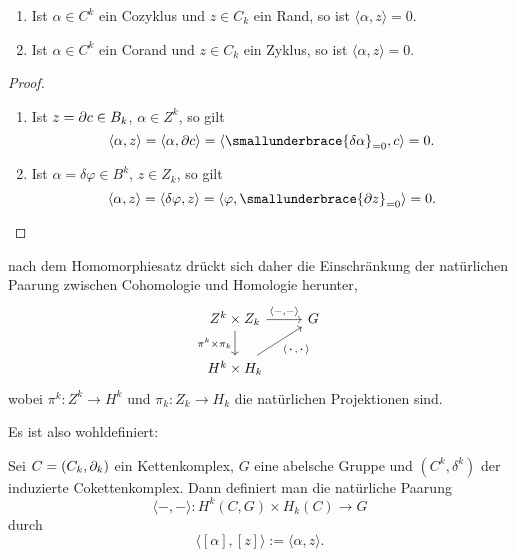 \begin{bemerkung}
  \begin{enumerate}
    \item 
      Ist $\alpha \in C^k$ ein Cozyklus und $z \in C_k$ ein Rand, so ist $\langle \alpha, z \rangle = 0$.
    \item
      Ist $\alpha \in C^k$ ein Corand und $z \in C_k$ ein Zyklus, so ist $\langle \alpha, z \rangle = 0$.
  \end{enumerate}
\end{bemerkung}
\begin{proof}
  \begin{enumerate}
    \item 
      Ist $z = \partial c \in B_k$, $\alpha \in Z^k$, so gilt
      \begin{equation*}
        \langle \alpha,z \rangle = \langle \alpha, \del c \rangle = \langle \smallunderbrace{\delta\alpha}_{=0}, c \rangle = 0.
      \end{equation*}
    \item
      Ist $\alpha = \delta \varphi \in B^k$, $z \in Z_k$, so gilt
      \begin{equation*}
        \langle \alpha,z \rangle = \langle \delta\varphi, z \rangle = \langle \varphi, \smallunderbrace{\del z}_{=0} \rangle = 0.
      \end{equation*}
  \end{enumerate}
\end{proof}
\begin{kommentar}
  nach dem Homomorphiesatz drückt sich daher die Einschränkung der natürlichen Paarung zwischen Cohomologie und Homologie herunter,
  \begin{equation*}
    \begin{tikzcd}
      Z^k \times Z_k  \arrow[swap]{d}{\pi^k \times \pi_k}
                      \arrow{r}{\langle -,- \rangle} & G \\
      H^k \times H_k \arrow[swap]{ur}{\langle \,\boldsymbol\cdot\,,\,\boldsymbol\cdot\, \rangle}
    \end{tikzcd}
  \end{equation*}
  wobei $\pi^k \colon Z^k \to H^k$ und $\pi_k \colon Z_k \to H_k$ die natürlichen Projektionen sind.
\end{kommentar}
Es ist also wohldefiniert:
\begin{defn}
  Sei $C = (C_k,\partial_k)$ ein Kettenkomplex, $G$ eine abelsche Gruppe und $(C^k,\delta^k)$ der induzierte Cokettenkomplex.
  Dann definiert man die natürliche Paarung
  \begin{equation*}
    \langle - , - \rangle\colon H^k(C,G) \times H_k(C) \to G
  \end{equation*}
  durch
  \begin{equation*}
    \langle [\alpha], [z] \rangle := \langle \alpha, z \rangle.
  \end{equation*}
\end{defn}
